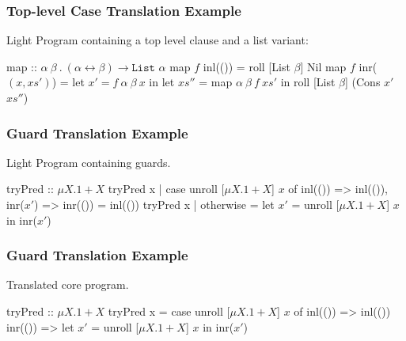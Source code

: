 \documentclass{beamer}
\begin{document}
\begin{frame}[fragile]\frametitle{Top-level Case Translation Example}

  Light Program containing a top level clause and a list variant:

    \begin{rfuncode}
map :: $\alpha~\beta~.~(\alpha \leftrightarrow \beta) \rightarrow \texttt{List } \alpha$
map $f$ inl(()) = roll [List $\beta$] Nil
map $f$ inr($(x, xs')$) = let $x' = f~\alpha~\beta~x$
                   in let $xs''$ = map $\alpha~\beta~f~xs'$
                   in roll [List $\beta$] (Cons $x'$ $xs''$)
    \end{rfuncode}

\end{frame}


\begin{frame}[fragile]\frametitle{Guard Translation Example}

  Light Program containing guards.

    \begin{rfuncode}
tryPred :: $\mu X . 1 + X$
tryPred x | case unroll [$\mu X . 1 + X$] $x$ of
              inl(()) => inl(()),
              inr($x'$) => inr(()) = inl(())
tryPred x | otherwise = let $x'$ = unroll [$\mu X . 1 + X$] $x$
                          in inr($x'$)
    \end{rfuncode}

\end{frame}

\begin{frame}[fragile]\frametitle{Guard Translation Example}

  Translated core program.

    \begin{rfuncode}
tryPred :: $\mu X . 1 + X$
tryPred x = case unroll [$\mu X . 1 + X$] $x$ of
              inl(()) => inl(())
              inr(()) => let $x'$ = unroll [$\mu X . 1 + X$] $x$
                         in inr($x'$)
    \end{rfuncode}

\end{frame}
\end{document}
